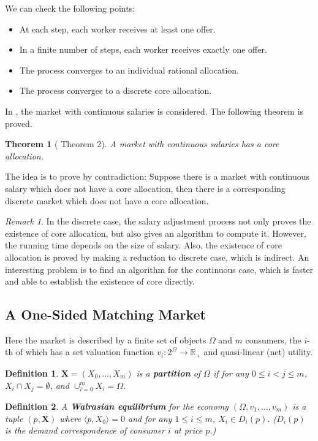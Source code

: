 \documentclass[openany]{book}
\newtheorem{definition}{Definition}[chapter]
\newtheorem{theorem}{Theorem}[chapter]
\theoremstyle{remark}
\newtheorem*{remark}{Remark}
\begin{document}
We can check the following points:
\begin{itemize}
    \item At each step, each worker receives at least one offer.
    \item In a finite number of steps, each worker receives exactly one offer.
    \item The process converges to an individual rational allocation.
    \item The process converges to a discrete core allocation.
\end{itemize}

In \cite{KC82}, the market with continuous salaries is considered. The following theorem is proved.
\begin{theorem}[\cite{KC82} Theorem 2]\label{thm:contMatchingCore}
    A market with continuous salaries has a core allocation.
\end{theorem}
The idea is to prove by contradiction: Suppose there is a market with continuous salary which does not have a core allocation, then there is a corresponding discrete market which does not have a core allocation.

\begin{remark}
    In the discrete case, the salary adjustment process not only proves the existence of core allocation, but also gives an algorithm to compute it. However, the running time depends on the size of salary. Also, the existence of core allocation is proved by making a reduction to discrete case, which is indirect. An interesting problem is to find an algorithm for the continuous case, which is faster and able to establish the existence of core directly.
\end{remark}

\subsection{A One-Sided Matching Market}
Here the market is described by a finite set of objects $\Omega$ and $m$ consumers, the $i$-th of which has a set valuation function $v_i:2^{\Omega}\to \mathbb{R}_+$ and quasi-linear (net) utility.
\begin{definition}
    $\mathbf{X}=(X_0,\ldots,X_m)$ is a \textbf{partition} of $\Omega$ if for any $0\le i<j\le m$, $X_i\cap X_j=\emptyset$, and $\cup_{i=0}^m X_i=\Omega$.
\end{definition}
\begin{definition}
    A \textbf{Walrasian equilibrium} for the economy $(\Omega,v_1,\ldots,v_m)$ is a tuple $(p,\mathbf{X})$ where $\langle p,X_0\rangle=0$ and for any $1\le i\le m$, $X_i\in D_i(p)$. ($D_i(p)$ is the demand correspondence of consumer $i$ at price $p$.)
\end{definition}
\end{document}
